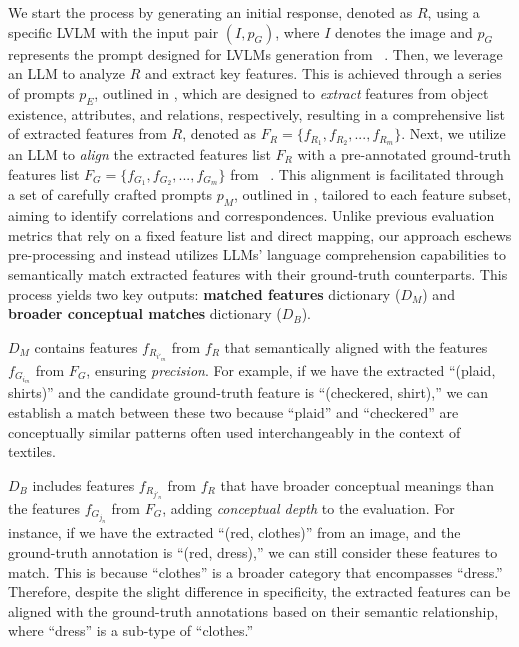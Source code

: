 We start the process by generating an initial response, denoted as $R$, using a specific LVLM with the input pair $(I, p_G)$, where $I$ denotes the image and $p_G$ represents the prompt designed for LVLMs generation from \data~. Then, we leverage an LLM to analyze $R$ and extract key features. This is achieved through a series of prompts $p_E$, outlined in , which are designed to \textit{extract} features from object existence, attributes, and relations, respectively, resulting in a comprehensive list of extracted features from $R$, denoted as $F_R=\{f_{R_1}, f_{R_2}, ..., f_{R_m}\}$. Next, we utilize an LLM to \textit{align} the extracted features list $F_R$ with a pre-annotated ground-truth features list $F_G=\{f_{G_1}, f_{G_2}, ..., f_{G_m}\}$ from \data~. This alignment is facilitated through a set of carefully crafted prompts $p_M$, outlined in , tailored to each feature subset, aiming to identify correlations and correspondences. Unlike previous evaluation metrics that rely on a fixed feature list and direct mapping, our approach eschews pre-processing and instead utilizes LLMs' language comprehension capabilities to semantically match extracted features with their ground-truth counterparts. This process yields two key outputs: \textbf{matched features} dictionary ($D_{M}$) and \textbf{broader conceptual matches} dictionary ($D_{B}$).

$D_{M}$ contains features $f_{R_{i'_m}}$ from $f_R$ that semantically aligned with the features $f_{G_{i_m}}$ from $F_G$, ensuring \textit{precision}. For example, if we have the extracted ``(plaid, shirts)'' and the candidate ground-truth feature is ``(checkered, shirt),'' we can establish a match between these two because ``plaid'' and ``checkered'' are conceptually similar patterns often used interchangeably in the context of textiles. 

$D_{B}$ includes features $f_{R_{j'_n}}$ from $f_R$ that have broader conceptual meanings than the features $f_{G_{j_n}}$ from $F_G$, adding \textit{conceptual depth} to the evaluation. For instance, if we have the extracted ``(red, clothes)'' from an image, and the ground-truth annotation is ``(red, dress),'' we can still consider these features to match. This is because ``clothes'' is a broader category that encompasses ``dress.'' Therefore, despite the slight difference in specificity, the extracted features can be aligned with the ground-truth annotations based on their semantic relationship, where ``dress'' is a sub-type of ``clothes.''

